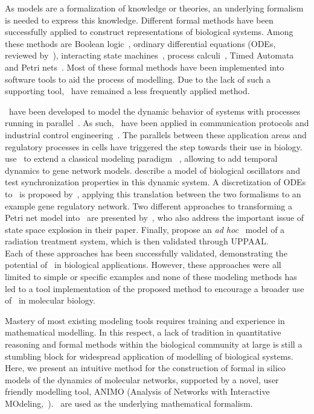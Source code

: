 As models are a formalization of knowledge or theories, an underlying formalism is needed to express
this knowledge. Different formal methods have been successfully applied to construct representations
of biological systems. Among these methods are Boolean logic~\citep{boolean-networks-flower,boolean-networks2},
ordinary differential equations (ODEs, reviewed by~\citealp[]{hidde-review}),
interacting state machines~\citep{interacting-sm1,interacting-sm2},
process calculi~\citep{blenx,bio-pepa}, Timed Automata~\citep{ta-siebert,bartocci-oscillators,
oded-ode-ta-discretization} and Petri nets~\citep{petri-nets,petri-nets2}.
Most of these formal methods have been implemented into software tools to aid the process
of modelling. Due to the lack of such a supporting tool, \tas\ have remained a less 
frequently applied method.

\tas\ have been developed to model the dynamic behavior of systems with processes running in parallel~\citep{timed-automata-alur-dill}. 
As such, \tas\ have been applied in communication protocols and industrial control engineering~\citep{ta-audio-protocol,ta-wap-gateway,ta-ws-bap}. The 
parallels between these application areas and regulatory processes in cells have triggered the step towards 
their use in biology.
\cite{ta-siebert} use \tas\ to extend a classical modeling paradigm
~\citep{thomas-formalism}, allowing to add temporal dynamics to gene network models.
\cite{bartocci-oscillators} describe a model of biological oscillators and test 
synchronization properties in this dynamic system.
A discretization of ODEs to \tas\ is proposed by~\citet{oded-ode-ta-discretization}, applying
this translation between the two formalisms to an example gene regulatory network. Two 
different approaches to transforming
a Petri net model into \tas\ are presented by~\citet{ta-giapponesi},
who also address the important issue of state space explosion in their paper.
Finally, \cite{ta-radiazioni} propose an \emph{ad hoc} \tas\ model of a radiation treatment
system, which is then validated through UPPAAL.\\
Each of these approaches has been successfully validated, demonstrating the potential of \tas\
in biological applications. However, these approaches were all limited to simple
or specific examples and none of these modeling methods
has led to a tool implementation of the proposed method to encourage a broader use
of \tas\ in molecular biology.

Mastery of most existing modeling tools requires training and experience in mathematical modelling. 
In this respect, a lack of tradition in quantitative
reasoning and formal methods within the biological community at large is still a stumbling block for
widespread application of modelling of biological systems. Here, we present an intuitive method for the
construction of formal in silico models of the dynamics of molecular networks, supported by a novel,
user friendly modelling tool, ANIMO (Analysis of Networks with Interactive 
MOdeling,~\citealp[]{animo-bibe}). \tas\ are used as the underlying mathematical formalism.

